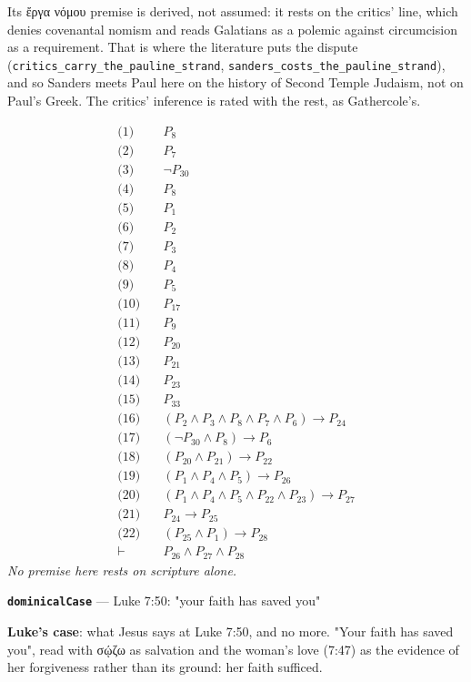 \documentclass[11pt]{article}
\begin{document}
Its ἔργα νόμου premise is derived, not assumed: it rests on the critics' line, which denies covenantal nomism and reads Galatians as a polemic against circumcision as a requirement. That is where the literature puts the dispute (\texttt{critics\_\allowbreak{}carry\_\allowbreak{}the\_\allowbreak{}pauline\_\allowbreak{}strand}, \texttt{sanders\_\allowbreak{}costs\_\allowbreak{}the\_\allowbreak{}pauline\_\allowbreak{}strand}), and so Sanders meets Paul here on the history of Second Temple Judaism, not on Paul's Greek. The critics' inference is rated with the rest, as Gathercole's.

\begin{align*}
  \text{(1)} \quad & P_{8} \\
  \text{(2)} \quad & P_{7} \\
  \text{(3)} \quad & \lnot P_{30} \\
  \text{(4)} \quad & P_{8} \\
  \text{(5)} \quad & P_{1} \\
  \text{(6)} \quad & P_{2} \\
  \text{(7)} \quad & P_{3} \\
  \text{(8)} \quad & P_{4} \\
  \text{(9)} \quad & P_{5} \\
  \text{(10)} \quad & P_{17} \\
  \text{(11)} \quad & P_{9} \\
  \text{(12)} \quad & P_{20} \\
  \text{(13)} \quad & P_{21} \\
  \text{(14)} \quad & P_{23} \\
  \text{(15)} \quad & P_{33} \\
  \text{(16)} \quad & (P_{2} \land P_{3} \land P_{8} \land P_{7} \land P_{6}) \rightarrow P_{24} \\
  \text{(17)} \quad & (\lnot P_{30} \land P_{8}) \rightarrow P_{6} \\
  \text{(18)} \quad & (P_{20} \land P_{21}) \rightarrow P_{22} \\
  \text{(19)} \quad & (P_{1} \land P_{4} \land P_{5}) \rightarrow P_{26} \\
  \text{(20)} \quad & (P_{1} \land P_{4} \land P_{5} \land P_{22} \land P_{23}) \rightarrow P_{27} \\
  \text{(21)} \quad & P_{24} \rightarrow P_{25} \\
  \text{(22)} \quad & (P_{25} \land P_{1}) \rightarrow P_{28} \\
  \vdash \quad & P_{26} \land P_{27} \land P_{28}
\end{align*}
\emph{No premise here rests on scripture alone.}
\par\medskip\noindent\textbf{\texttt{dominical\allowbreak{}Case}} --- Luke 7:50: "your faith has saved you"\par\nobreak\noindent
\textbf{Luke's case}: what Jesus says at Luke 7:50, and no more. "Your faith has saved you", read with σῴζω as salvation and the woman's love (7:47) as the evidence of her forgiveness rather than its ground: her faith sufficed.
\end{document}
